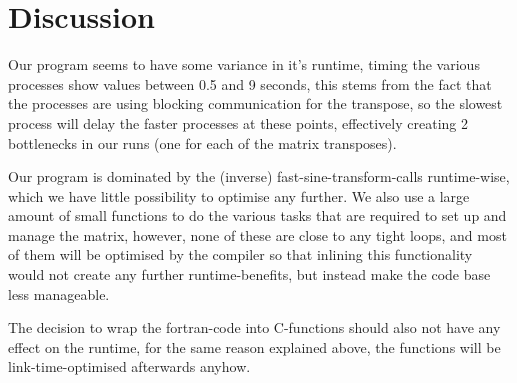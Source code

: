 \section{Discussion}

Our program seems to have some variance in it's runtime, timing the various processes show values
between 0.5 and 9 seconds, this stems from the fact that the processes are using blocking communication
for the transpose, so the slowest process will delay the faster processes at these points, effectively creating
2 bottlenecks in our runs (one for each of the matrix transposes).

Our program is dominated by the (inverse) fast-sine-transform-calls runtime-wise, which we have little possibility
to optimise any further. We also use a large amount of small functions to do the various tasks that are required to
set up and manage the matrix, however, none of these are close to any tight loops, and most of them will be optimised
by the compiler so that inlining this functionality would not create any further runtime-benefits, but instead make the
code base less manageable.

The decision to wrap the fortran-code into C-functions should also not have any effect on the runtime, for the same reason
explained above, the functions will be link-time-optimised afterwards anyhow.
